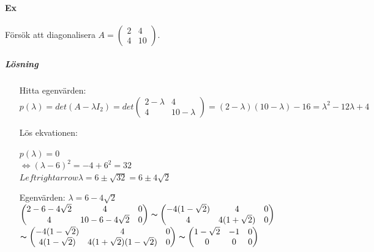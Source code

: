 \clearpage
\paragraph{Ex} Försök att diagonalisera $A=\begin{pmatrix}2&4\\4&10\end{pmatrix}$.
\subparagraph{Lösning}
\begin{enumerate}
    \item[Hitta egenvärden:]
        \begin{equation*}
            p(\lambda)=det(A-\lambda I_2)=
            det\begin{pmatrix}
                2-\lambda&4\\4&10-\lambda
            \end{pmatrix}=
            (2-\lambda)(10-\lambda)-16=
            \lambda^2-12\lambda+4
        \end{equation*} 
    \item[Lös ekvationen:]
        \begin{center}
            $p(\lambda)=0$\\
            $\Leftrightarrow (\lambda-6)^2=-4+6^2=32$\\
            $Leftrightarrow \lambda = 6\pm \sqrt{32}=6\pm 4\sqrt{2}$
        \end{center}
    \item[Egenvärden:] \underline{$\lambda=6-4\sqrt{2}$}\\
        $\begin{pmatrix}
            2-6-4\sqrt{2}&4&0\\
            4&10-6-4\sqrt{2}&0
        \end{pmatrix}
        \thicksim
        \begin{pmatrix}
            -4(1-\sqrt{2})&4&0\\
            4&4(1+\sqrt{2})&0
        \end{pmatrix}$\\
        $\thicksim
        \begin{pmatrix}
            -4(1-\sqrt{2})&4&0\\
            4(1-\sqrt{2})&4(1+\sqrt{2})(1-\sqrt{2})&0
        \end{pmatrix}
        \thicksim
        \begin{pmatrix}
            1-\sqrt{2}&-1&0\\
            0&0&0
        \end{pmatrix}$\\

\end{enumerate}
